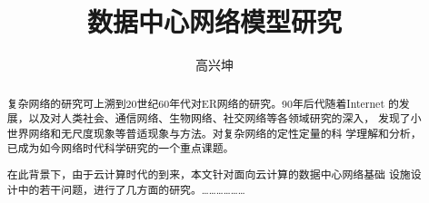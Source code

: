 \documentclass[master]{njuthesis}
\title{数据中心网络模型研究}
\author{高兴坤}
\institute{南京大学}
\begin{document}

\makenlctitle
\maketitle
\makeenglishtitle


\frontmatter


\begin{abstract}
复杂网络的研究可上溯到20世纪60年代对ER网络的研究。90年后代随着Internet
的发展，以及对人类社会、通信网络、生物网络、社交网络等各领域研究的深入，
发现了小世界网络和无尺度现象等普适现象与方法。对复杂网络的定性定量的科
学理解和分析，已成为如今网络时代科学研究的一个重点课题。

在此背景下，由于云计算时代的到来，本文针对面向云计算的数据中心网络基础
设施设计中的若干问题，进行了几方面的研究。………………
\end{abstract}

\begin{englishabstract}

\end{englishabstract}
\end{document}
